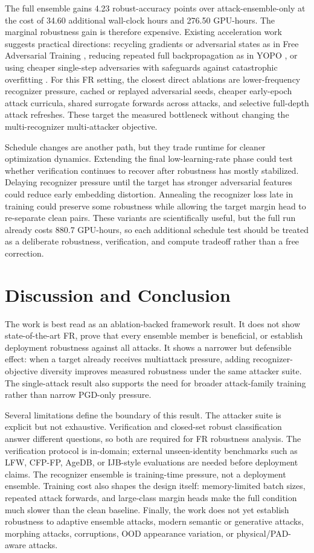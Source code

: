 \documentclass[conference]{IEEEtran}
\begin{document}
The full ensemble gains 4.23 robust-accuracy points over attack-ensemble-only
at the cost of 34.60 additional wall-clock hours and 276.50 GPU-hours. The
marginal robustness gain is therefore expensive. Existing acceleration work
suggests practical directions: recycling gradients or adversarial states as in
Free Adversarial Training \cite{freeadv}, reducing repeated full
backpropagation as in YOPO \cite{yopo}, or using cheaper single-step
adversaries with safeguards against catastrophic overfitting \cite{fastadv}.
For this FR setting, the closest direct ablations are lower-frequency
recognizer pressure, cached or replayed adversarial seeds, cheaper early-epoch
attack curricula, shared surrogate forwards across attacks, and selective
full-depth attack refreshes. These target the measured bottleneck without
changing the multi-recognizer multi-attacker objective.

Schedule changes are another path, but they trade runtime for cleaner
optimization dynamics. Extending the final low-learning-rate phase could test
whether verification continues to recover after robustness has mostly
stabilized. Delaying recognizer pressure until the target has stronger
adversarial features could reduce early embedding distortion. Annealing the
recognizer loss late in training could preserve some robustness while allowing
the target margin head to re-separate clean pairs. These variants are
scientifically useful, but the full run already costs 880.7 GPU-hours, so each
additional schedule test should be treated as a deliberate robustness,
verification, and compute tradeoff rather than a free correction.

\section{Discussion and Conclusion}
The work is best read as an ablation-backed framework result. It does not show
state-of-the-art FR, prove that every ensemble member is beneficial, or
establish deployment robustness against all attacks. It shows a narrower but
defensible effect: when a target already receives multiattack pressure, adding
recognizer-objective diversity improves measured robustness under the same
attacker suite. The single-attack result also supports the need for broader
attack-family training rather than narrow PGD-only pressure.

Several limitations define the boundary of this result. The attacker suite is
explicit but not exhaustive. Verification and closed-set robust classification
answer different questions, so both are required for FR robustness analysis.
The verification protocol is in-domain; external unseen-identity benchmarks
such as LFW, CFP-FP, AgeDB, or IJB-style evaluations are needed before
deployment claims. The recognizer ensemble is training-time pressure, not a
deployment ensemble. Training cost also shapes the design itself:
memory-limited batch sizes, repeated attack forwards, and large-class margin
heads make the full condition much slower than the clean baseline. Finally,
the work does not yet establish robustness to adaptive ensemble attacks,
modern semantic or generative attacks, morphing attacks, corruptions, OOD
appearance variation, or physical/PAD-aware attacks.
\end{document}
